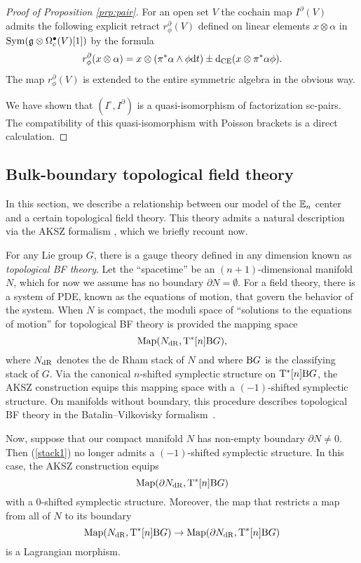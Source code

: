 \documentclass[11pt]{amsart}
\numberwithin{equation}{section}
\begin{document}
\begin{proof}[Proof of Proposition \ref{prp:pair}]
For an open set $V$ the cochain map $I^{\partial}(V)$ admits the following explicit retract $r_\phi^\partial(V)$ defined on linear elements $x \otimes \alpha$ in ${\rm Sym} (\mathfrak g \otimes \Omega^\bullet_c(V)[1])$ by the formula
\[
r_{\phi}^\partial (x \otimes \alpha) = x \otimes (\pi^* \alpha \wedge \phi {\rm d} t) \pm {\rm d}_{\rm CE} (x \otimes \pi^* \alpha \phi ) .
\]
The map $r_\phi^\partial (V)$ is extended to the entire symmetric algebra in the obvious way. 

We have shown that $(I^{\circ}, I^\partial)$ is a quasi-isomorphism of factorization sc-pairs. 
The compatibility of this quasi-isomorphism with Poisson brackets is a direct calculation. 
\end{proof}

\subsection{Bulk-boundary topological field theory}

In this section, we describe a relationship between our model of the $\mathbb E_n$ center and a certain topological field theory. 
This theory admits a natural description via the AKSZ formalism \cite{AKSZ}, which we briefly recount now. 

For any Lie group $G$, there is a gauge theory defined in any dimension known as {\em topological BF theory}.
Let the ``spacetime'' be an $(n+1)$-dimensional manifold $N$, 
which for now we assume has no boundary $\partial N = \emptyset$. 
For a field theory, there is a system of PDE, known as the equations of motion, that govern the behavior of the system.
When $N$ is compact, the moduli space of ``solutions to the equations of motion'' for topological BF theory is provided the mapping space 
\begin{equation} 
\label{stack1}
{\rm Map}(N_{\rm dR} ,  {\rm T}^*[n] {\rm B} G),
\end{equation}
where $N_{\rm dR}$ denotes the de Rham stack of $N$ and where ${\rm B}G$ is the classifying stack of $G$.
Via the canonical $n$-shifted symplectic structure on ${\rm T}^* [n] {\rm B} G$, 
the AKSZ construction equips this mapping space with a $(-1)$-shifted symplectic structure. 
On manifolds without boundary, this procedure describes topological BF theory in the Batalin--Vilkovisky formalism~\cite{BV}. 

Now, suppose that our compact manifold $N$ has non-empty boundary $\partial N \ne 0$.
Then (\ref{stack1}) no longer admits a $(-1)$-shifted symplectic structure. 
In this case, the AKSZ construction equips 
\[
{\rm Map}(\partial N_{\rm dR} , {\rm T}^* [n] {\rm B} G)
\]
with a $0$-shifted symplectic structure. 
Moreover, the map that restricts a map from all of $N$ to its boundary
\[
{\rm Map}(N_{\rm dR} , {\rm T}^* [n] {\rm B} G) \to {\rm Map}(\partial N_{\rm dR} , {\rm T}^* [n] {\rm B} G)
\]
is a Lagrangian morphism. 
\end{document}
